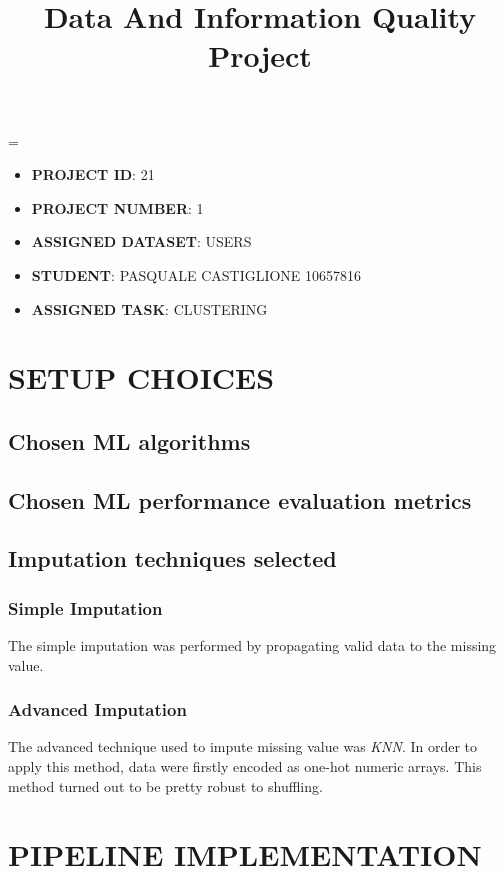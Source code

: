 \documentclass{article}
\title{
	\vspace{-2cm}
	\textbf{Data And Information Quality Project}\\
}
\author{}
\date{}
\newcommand{\justified}
{
	\tolerance=1
	\emergencystretch=\maxdimen
	\hyphenpenalty=10000
	\hbadness=10000
}
\begin{document}
\maketitle
\justified

\begin{itemize}
	\item\textbf{PROJECT ID}: 21
	\item\textbf{PROJECT NUMBER}: 1
	\item\textbf{ASSIGNED DATASET}: USERS
	\item\textbf{STUDENT}: PASQUALE CASTIGLIONE 10657816
	\item\textbf{ASSIGNED TASK}: CLUSTERING
\end{itemize}

\newpage

\tableofcontents

\newpage

\section{SETUP CHOICES}
\subsection{Chosen ML algorithms}
\subsection{Chosen ML performance evaluation metrics}
\subsection{Imputation techniques selected}
\subsubsection{Simple Imputation}
The simple imputation was performed by propagating valid data to the missing value.
\subsubsection{Advanced Imputation}
The advanced technique used to impute missing value was \emph{KNN}. In order to apply this method, data were firstly encoded as one-hot numeric arrays.
This method turned out to be pretty robust to shuffling.
\section{PIPELINE IMPLEMENTATION}
\end{document}
